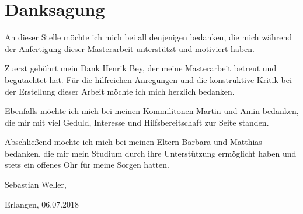 \chapter*{Danksagung}
An dieser Stelle möchte ich mich bei all denjenigen bedanken, die mich während der Anfertigung dieser Masterarbeit unterstützt und motiviert haben.

Zuerst gebührt mein Dank Henrik Bey, der meine Masterarbeit betreut und begutachtet hat. Für die hilfreichen Anregungen und die konstruktive Kritik bei der Erstellung dieser Arbeit möchte ich mich herzlich bedanken.

Ebenfalls möchte ich mich bei meinen Kommilitonen Martin und Amin bedanken, die mir mit viel Geduld, Interesse und Hilfsbereitschaft zur Seite standen.

Abschließend möchte ich mich bei meinen Eltern Barbara und Matthias bedanken, die mir mein Studium durch ihre Unterstützung ermöglicht haben und stets ein offenes Ohr für meine Sorgen hatten.

Sebastian Weller,

Erlangen, 06.07.2018

